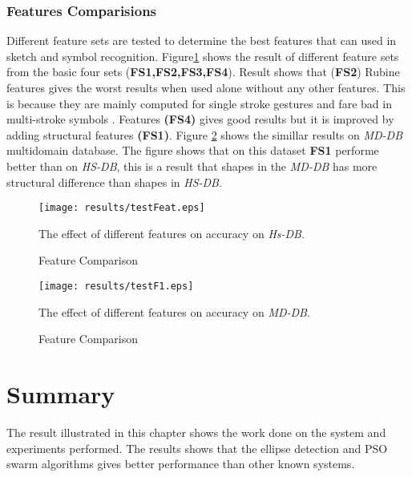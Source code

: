\subsubsection{Features Comparisions}
\label{sec:featuresComparisions}
Different feature sets are tested to determine the best features that can used in sketch and symbol recognition. Figure\ref{fig:testFeaturesAllHS} shows the result of different feature sets from the basic four sets (\textbf{FS1,FS2,FS3,FS4}). Result shows that (\textbf{FS2}) Rubine features \cite{gestureexample12} gives the worst results when used alone without any other features. This is because they are mainly computed for single stroke gestures and fare bad in multi-stroke symbols \cite{compareFeaturSVM}. Features \textbf{(FS4)} gives good results but it is improved by adding structural features \textbf{(FS1)}.  Figure \ref{fig:testFeaturesAllMD} shows the simillar results on \textsl{MD-DB} multidomain database. The figure shows that on this dataset \textbf{FS1} performe better than on \textsl{HS-DB}, this is a result that shapes in the \textsl{MD-DB} has more structural difference than shapes in \textsl{HS-DB}.
 \begin{figure}
	\centering
		\texttt{[image: results/testFeat.eps]}
	\caption{Feature Comparison} The effect of different features on accuracy on \textsl{Hs-DB}.  %
	\label{fig:testFeaturesAllHS}
\end{figure}  

 \begin{figure}
	\centering
		\texttt{[image: results/testF1.eps]}
	\caption{Feature Comparison} The effect of different features on accuracy on \textsl{MD-DB}.  %
	\label{fig:testFeaturesAllMD}
\end{figure}  


\section{Summary}
\label{sec:ResultSummary}

The result illustrated in this chapter shows the work done on the system and experiments performed. The results shows that the ellipse detection and PSO swarm algorithms gives better performance than other known systems. 



